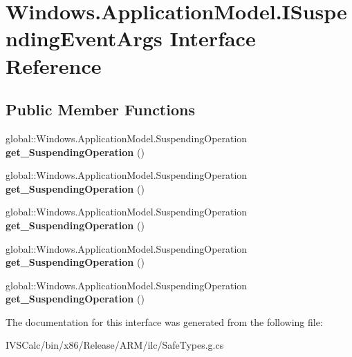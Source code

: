 \hypertarget{interface_windows_1_1_application_model_1_1_i_suspending_event_args}{}\section{Windows.\+Application\+Model.\+I\+Suspending\+Event\+Args Interface Reference}
\label{interface_windows_1_1_application_model_1_1_i_suspending_event_args}
\subsection*{Public Member Functions}
\begin{DoxyCompactItemize}
\item 
\mbox{\label{interface_windows_1_1_application_model_1_1_i_suspending_event_args_a2cf97fca131ef6077162af91a52bdd6b}} 
global\+::\+Windows.\+Application\+Model.\+Suspending\+Operation {\bfseries get\+\_\+\+Suspending\+Operation} ()
\item 
\mbox{\label{interface_windows_1_1_application_model_1_1_i_suspending_event_args_a2cf97fca131ef6077162af91a52bdd6b}} 
global\+::\+Windows.\+Application\+Model.\+Suspending\+Operation {\bfseries get\+\_\+\+Suspending\+Operation} ()
\item 
\mbox{\label{interface_windows_1_1_application_model_1_1_i_suspending_event_args_a2cf97fca131ef6077162af91a52bdd6b}} 
global\+::\+Windows.\+Application\+Model.\+Suspending\+Operation {\bfseries get\+\_\+\+Suspending\+Operation} ()
\item 
\mbox{\label{interface_windows_1_1_application_model_1_1_i_suspending_event_args_a2cf97fca131ef6077162af91a52bdd6b}} 
global\+::\+Windows.\+Application\+Model.\+Suspending\+Operation {\bfseries get\+\_\+\+Suspending\+Operation} ()
\item 
\mbox{\label{interface_windows_1_1_application_model_1_1_i_suspending_event_args_a2cf97fca131ef6077162af91a52bdd6b}} 
global\+::\+Windows.\+Application\+Model.\+Suspending\+Operation {\bfseries get\+\_\+\+Suspending\+Operation} ()
\end{DoxyCompactItemize}


The documentation for this interface was generated from the following file\+:\begin{DoxyCompactItemize}
\item 
I\+V\+S\+Calc/bin/x86/\+Release/\+A\+R\+M/ilc/Safe\+Types.\+g.\+cs\end{DoxyCompactItemize}
